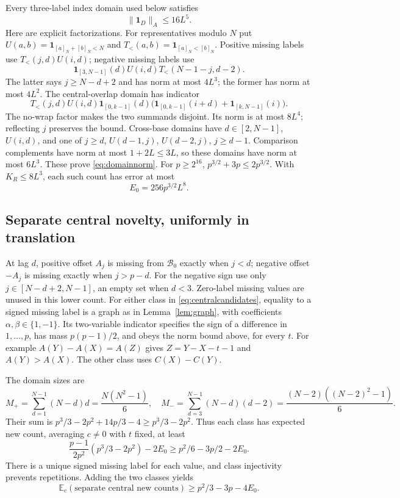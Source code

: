 \documentclass[10pt]{amsart}
\theoremstyle{remark}
\newcommand{\E}{\mathbb E}
\newcommand{\ind}{\mathbf 1}
\newcommand{\normA}[1]{\lVert #1\rVert_A}
\newcommand{\Bset}{\mathcal B}
\begin{document}
Every three-label index domain used below satisfies
\begin{equation}\label{eq:domainnorm}
 \normA{\ind_D}\le16L^5.
\end{equation}
Here are explicit factorizations. For representatives modulo $N$ put
$U(a,b)=\ind_{[a]_N+[b]_N<N}$ and
$T_<(a,b)=\ind_{[a]_N<[b]_N}$. Positive missing labels use
$T_<(j,d)U(i,d)$; negative missing labels use
\[
 \ind_{[3,N-1]}(d)U(i,d)T_<(N-1-j,d-2).
\]
The latter says $j\ge N-d+2$ and has norm at most $4L^3$;
the former has norm at most $4L^2$.
The central-overlap domain has indicator
\begin{equation}\label{eq:overlapdomain}
 T_<(j,d)U(i,d)\ind_{[0,k-1]}(d)
 \bigl(\ind_{[0,k-1]}(i+d)+\ind_{[k,N-1]}(i)\bigr).
\end{equation}
The no-wrap factor makes the two summands disjoint. Its norm is at
most $8L^4$; reflecting $j$ preserves the bound.
Cross-base domains have $d\in[2,N-1]$, $U(i,d)$, and one of
$j\ge d$, $U(d-1,j)$, $U(d-2,j)$, $j\ge d-1$.
Comparison complements have norm at most $1+2L\le3L$, so these
domains have norm at most $6L^3$. These prove \eqref{eq:domainnorm}.
For $p\ge2^{16}$, $p^{3/2}+3p\le2p^{3/2}$. With $K_R\le8L^3$,
each such count has error at most
\begin{equation}\label{eq:Eerror}
 E_0=256p^{3/2}L^8.
\end{equation}

\subsection{Separate central novelty, uniformly in translation}
At lag $d$, positive offset $A_j$ is missing from $\Bset_0$ exactly
when $j<d$; negative offset $-A_j$ is missing exactly when $j>p-d$.
For the negative sign use only $j\in[N-d+2,N-1]$, an empty set when
$d<3$. Zero-label missing values are unused in this lower count.
For either class in \eqref{eq:centralcandidates}, equality to a signed
missing label is a graph as in Lemma~\ref{lem:graph}, with coefficients
$\alpha,\beta\in\{1,-1\}$. Its two-variable indicator specifies the
sign of a difference in $1,\ldots,p$, has mass $p(p-1)/2$, and obeys
the norm bound above, for every $t$. For example
$A(Y)-A(X)=A(Z)$ gives $Z=Y-X-t-1$ and $A(Y)>A(X)$.
The other class uses $C(X)-C(Y)$.

The domain sizes are
\[
 M_+=\sum_{d=1}^{N-1}(N-d)d=\frac{N(N^2-1)}6,\quad
 M_-=\sum_{d=3}^{N-1}(N-d)(d-2)=\frac{(N-2)((N-2)^2-1)}6.
\]
Their sum is $p^3/3-2p^2+14p/3-4\ge p^3/3-2p^2$.
Thus each class has expected new count, averaging $c\ne0$ with $t$
fixed, at least
\[
 \frac{p-1}{2p^2}(p^3/3-2p^2)-2E_0
 \ge p^2/6-3p/2-2E_0.
\]
There is a unique signed missing label for each value, and class
injectivity prevents repetitions. Adding the two classes yields
\begin{equation}\label{eq:separatecentral}
 \E_c(\text{separate central new counts})\ge p^2/3-3p-4E_0.
\end{equation}
\end{document}
